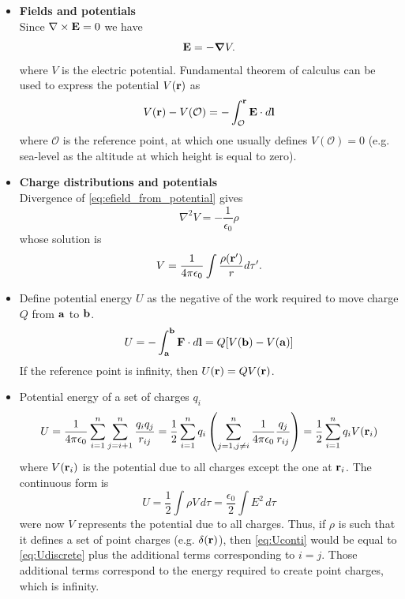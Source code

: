 \documentclass[a4paper,11pt]{report}
\begin{document}
\begin{itemize}
\item \textbf{Fields and potentials}\\
Since $\nabla \times \mathbf{E} = 0$ we have 
\begin{equation}
\label{eq:efield_from_potential}
\mathbf{E} = -\bm \nabla V.
\end{equation}
where $V$ is the electric potential. Fundamental theorem of calculus can be used to express the potential $V(\mathbf{r})$ as
\begin{equation}
V(\mathbf{r}) - V(\mathcal{O}) = -\int_\mathcal{O}^{\mathbf{r}} \mathbf{E} \cdot d\mathbf{l}
\end{equation}
where $\mathcal{O}$ is the reference point, at which one usually defines $V(\mathcal{O}) = 0$ (e.g. sea-level as the altitude at which height is equal to zero). 

\item \textbf{Charge distributions and potentials}\\
Divergence of \cref{eq:efield_from_potential} gives
\begin{equation}
\nabla^2 V = - \frac{1}{\epsilon_0} \rho
\end{equation}
whose solution is
\begin{equation}
V = \frac{1}{4 \pi \epsilon_0} \int \frac{\rho(\mathbf{r}')}{r} d\tau'.
\end{equation}

\item Define potential energy $U$ as the negative of the work required to move charge $Q$ from $\mathbf{a}$ to $\mathbf{b}$.
\begin{equation}
U = -\int_{\mathbf{a}}^{\mathbf{b}} \mathbf{F} \cdot d\mathbf{l} = Q [ V(\mathbf{b}) - V(\mathbf{a}) ]
\end{equation}
If the reference point is infinity, then $U(\mathbf{r}) = Q V(\mathbf{r})$.

\item Potential energy of a set of charges $q_i$ 
\begin{equation}
\label{eq:Udiscrete}
U = \frac{1}{4 \pi \epsilon_0} \sum^n_{i=1} \sum^n_{j = i+1} \frac{q_i q_j}{r_{ij}} = \frac{1}{2} \sum_{i=1}^{n} q_i \left ( \sum_{j = 1, j \ne i}^{n} \frac{1}{4 \pi \epsilon_0} \frac{q_j}{r_{ij}} \right ) = \frac{1}{2} \sum_{i=1}^{n} q_i V(\mathbf{r}_i)
\end{equation}
where $V(\mathbf{r}_i)$ is the potential due to all charges except the one at $\mathbf{r}_i$. The continuous form is
\begin{equation}
\label{eq:Uconti}
U = \frac{1}{2} \int \rho V \, d\tau = \frac{\epsilon_0}{2} \int E^2 \, d\tau
\end{equation}
were now $V$ represents the potential due to all charges. Thus, if $\rho$ is such that it defines a set of point charges (e.g. $\delta(\mathbf{r})$), then \cref{eq:Uconti} would be equal to \cref{eq:Udiscrete} plus the additional terms corresponding to $i=j$. Those additional terms correspond to the energy required to create point charges, which is infinity. 


\end{itemize}
\end{document}
